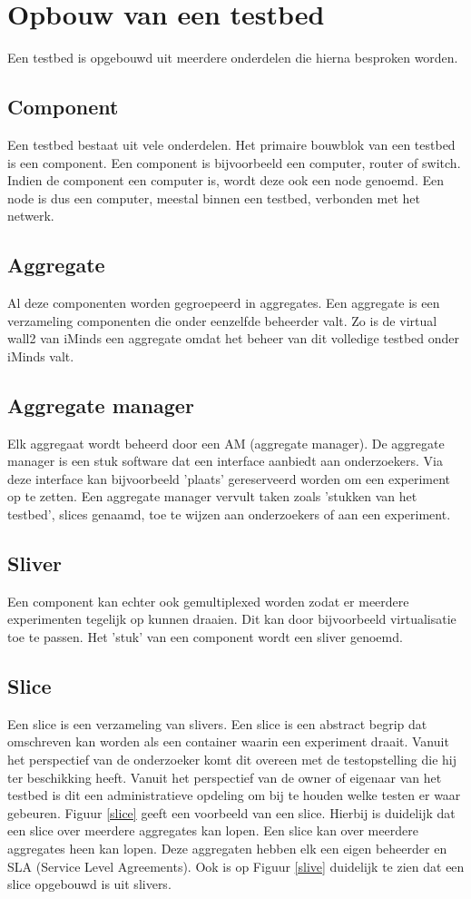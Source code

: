\section{Opbouw van een testbed}
Een testbed is opgebouwd uit meerdere onderdelen die hierna besproken worden.

\subsection{Component}
\npar
Een testbed bestaat uit vele onderdelen. Het primaire bouwblok van een testbed is een component. Een component is bijvoorbeeld een computer, router of switch. Indien de component een computer is, wordt deze ook een node genoemd. Een node is dus een computer, meestal binnen een testbed, verbonden met het netwerk. 
\subsection{Aggregate}
\npar
Al deze componenten worden gegroepeerd in aggregates. Een aggregate is een verzameling componenten die onder eenzelfde beheerder valt. Zo is de virtual wall2 van iMinds een aggregate omdat het beheer van dit volledige testbed onder iMinds valt.
\clearpage
\subsection{Aggregate manager}
\npar
Elk aggregaat wordt beheerd door een AM (aggregate manager). De aggregate manager is een stuk software dat een interface aanbiedt aan onderzoekers. Via deze interface kan bijvoorbeeld 'plaats' gereserveerd worden om een experiment op te zetten. Een aggregate manager vervult taken zoals 'stukken van het testbed', slices genaamd, toe te wijzen aan onderzoekers of aan een experiment.
\subsection{Sliver}
\npar
Een component kan echter ook gemultiplexed worden zodat er meerdere experimenten tegelijk op kunnen draaien. Dit kan door bijvoorbeeld virtualisatie toe te passen. Het 'stuk' van een component wordt een sliver genoemd.
\subsection{Slice}
\npar
Een slice is een verzameling van slivers. Een slice is een abstract begrip dat omschreven kan worden als een container waarin een experiment draait. Vanuit het perspectief van de onderzoeker komt dit overeen met de testopstelling die hij ter beschikking heeft. Vanuit het perspectief van de owner of eigenaar van het testbed is dit een administratieve opdeling om bij te houden welke testen er waar gebeuren. Figuur \ref{slice} geeft een voorbeeld van een slice. Hierbij is duidelijk dat een slice over meerdere aggregates kan lopen.  Een slice kan over meerdere aggregates heen kan lopen. Deze aggregaten hebben elk een eigen beheerder en SLA (Service Level Agreements). Ook is op Figuur \ref{slive} duidelijk te zien dat een slice opgebouwd is uit slivers.
\clearpage
